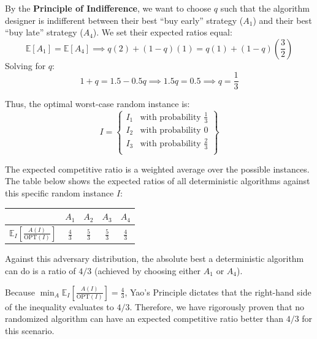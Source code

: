 \documentclass[14pt]{extreport}
\begin{document}
\vspace{5mm}
By the \textbf{Principle of Indifference}, we want to choose $q$ such that the algorithm designer is indifferent between their best ``buy early'' strategy ($A_1$) and their best ``buy late'' strategy ($A_4$). We set their expected ratios equal:
$$
\mathbb{E}[A_1] = \mathbb{E}[A_4] \implies q(2) + (1-q)(1) = q(1) + (1-q)\left(\frac{3}{2}\right)
$$
Solving for $q$:
$$
1 + q = 1.5 - 0.5q \implies 1.5q = 0.5 \implies q = \frac{1}{3}
$$

Thus, the optimal worst-case random instance is:
$$
I = \left\{ \begin{array}{cc}
I_1 & \text{with probability } \frac{1}{3} \\
I_2 & \text{with probability } 0 \\
I_3 & \text{with probability } \frac{2}{3} \\
\end{array} \right\}
$$

The expected competitive ratio is a weighted average over the possible instances. The table below shows the expected ratios of all deterministic algorithms against this specific random instance $I$:

\begin{center}
\begin{tabular}{c|cccc}
 & $A_1$ & $A_2$ & $A_3$ & $A_4$ \\
\hline
$\mathbb{E}_I \left[ \frac{A(I)}{\text{OPT}(I)} \right]$ & $\frac{4}{3}$ & $\frac{5}{3}$ & $\frac{5}{3}$ & $\frac{4}{3}$ \\
\end{tabular}
\end{center}

Against this adversary distribution, the absolute best a deterministic algorithm can do is a ratio of $4/3$ (achieved by choosing either $A_1$ or $A_4$). 

\vspace{5mm}
Because $\min_A \mathbb{E}_I \left[ \frac{A(I)}{\text{OPT}(I)} \right] = \frac{4}{3}$, Yao's Principle dictates that the right-hand side of the inequality evaluates to $4/3$. Therefore, we have rigorously proven that no randomized algorithm can have an expected competitive ratio better than $4/3$ for this scenario.
\end{document}
